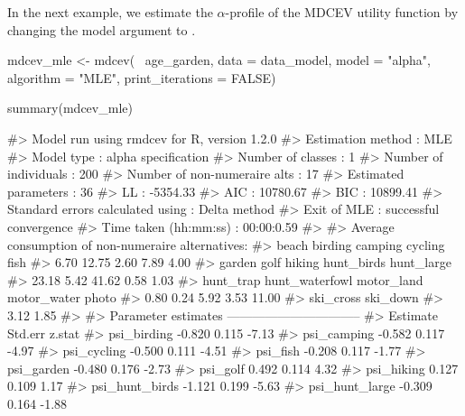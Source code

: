 In the next example, we estimate the \(\alpha\)-profile of the MDCEV
utility function by changing the model argument to .

\begin{Schunk}
\begin{Sinput}
mdcev_mle <- mdcev(~ age_garden,
                   data = data_model,
                   model = "alpha",
                   algorithm = "MLE",
                   print_iterations = FALSE)
\end{Sinput}
\end{Schunk}

\begin{Schunk}
\begin{Sinput}
summary(mdcev_mle)
\end{Sinput}
\begin{Soutput}
#> Model run using rmdcev for R, version 1.2.0 
#> Estimation method                : MLE
#> Model type                       : alpha specification
#> Number of classes                : 1
#> Number of individuals            : 200
#> Number of non-numeraire alts     : 17
#> Estimated parameters             : 36
#> LL                               : -5354.33
#> AIC                              : 10780.67
#> BIC                              : 10899.41
#> Standard errors calculated using : Delta method
#> Exit of MLE                      : successful convergence
#> Time taken (hh:mm:ss)            : 00:00:0.59
#> 
#> Average consumption of non-numeraire alternatives:
#>          beach        birding        camping        cycling           fish 
#>           6.70          12.75           2.60           7.89           4.00 
#>         garden           golf         hiking     hunt_birds     hunt_large 
#>          23.18           5.42          41.62           0.58           1.03 
#>      hunt_trap hunt_waterfowl     motor_land    motor_water          photo 
#>           0.80           0.24           5.92           3.53          11.00 
#>      ski_cross       ski_down 
#>           3.12           1.85 
#> 
#> Parameter estimates --------------------------------  
#>                      Estimate Std.err z.stat
#> psi_birding            -0.820   0.115  -7.13
#> psi_camping            -0.582   0.117  -4.97
#> psi_cycling            -0.500   0.111  -4.51
#> psi_fish               -0.208   0.117  -1.77
#> psi_garden             -0.480   0.176  -2.73
#> psi_golf                0.492   0.114   4.32
#> psi_hiking              0.127   0.109   1.17
#> psi_hunt_birds         -1.121   0.199  -5.63
#> psi_hunt_large         -0.309   0.164  -1.88

\end{Soutput}
\end{Schunk}
